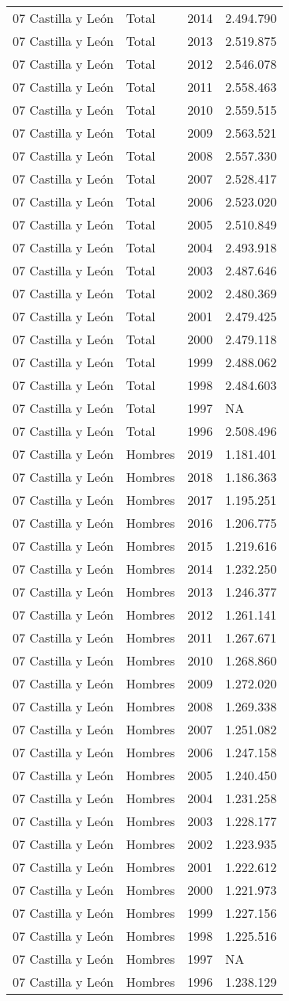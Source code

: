 \documentclass[
]{article}
\begin{document}
\begin{longtable}[]{@{}llrl@{}}
07 Castilla y León & Total & 2014 & 2.494.790\tabularnewline
07 Castilla y León & Total & 2013 & 2.519.875\tabularnewline
07 Castilla y León & Total & 2012 & 2.546.078\tabularnewline
07 Castilla y León & Total & 2011 & 2.558.463\tabularnewline
07 Castilla y León & Total & 2010 & 2.559.515\tabularnewline
07 Castilla y León & Total & 2009 & 2.563.521\tabularnewline
07 Castilla y León & Total & 2008 & 2.557.330\tabularnewline
07 Castilla y León & Total & 2007 & 2.528.417\tabularnewline
07 Castilla y León & Total & 2006 & 2.523.020\tabularnewline
07 Castilla y León & Total & 2005 & 2.510.849\tabularnewline
07 Castilla y León & Total & 2004 & 2.493.918\tabularnewline
07 Castilla y León & Total & 2003 & 2.487.646\tabularnewline
07 Castilla y León & Total & 2002 & 2.480.369\tabularnewline
07 Castilla y León & Total & 2001 & 2.479.425\tabularnewline
07 Castilla y León & Total & 2000 & 2.479.118\tabularnewline
07 Castilla y León & Total & 1999 & 2.488.062\tabularnewline
07 Castilla y León & Total & 1998 & 2.484.603\tabularnewline
07 Castilla y León & Total & 1997 & NA\tabularnewline
07 Castilla y León & Total & 1996 & 2.508.496\tabularnewline
07 Castilla y León & Hombres & 2019 & 1.181.401\tabularnewline
07 Castilla y León & Hombres & 2018 & 1.186.363\tabularnewline
07 Castilla y León & Hombres & 2017 & 1.195.251\tabularnewline
07 Castilla y León & Hombres & 2016 & 1.206.775\tabularnewline
07 Castilla y León & Hombres & 2015 & 1.219.616\tabularnewline
07 Castilla y León & Hombres & 2014 & 1.232.250\tabularnewline
07 Castilla y León & Hombres & 2013 & 1.246.377\tabularnewline
07 Castilla y León & Hombres & 2012 & 1.261.141\tabularnewline
07 Castilla y León & Hombres & 2011 & 1.267.671\tabularnewline
07 Castilla y León & Hombres & 2010 & 1.268.860\tabularnewline
07 Castilla y León & Hombres & 2009 & 1.272.020\tabularnewline
07 Castilla y León & Hombres & 2008 & 1.269.338\tabularnewline
07 Castilla y León & Hombres & 2007 & 1.251.082\tabularnewline
07 Castilla y León & Hombres & 2006 & 1.247.158\tabularnewline
07 Castilla y León & Hombres & 2005 & 1.240.450\tabularnewline
07 Castilla y León & Hombres & 2004 & 1.231.258\tabularnewline
07 Castilla y León & Hombres & 2003 & 1.228.177\tabularnewline
07 Castilla y León & Hombres & 2002 & 1.223.935\tabularnewline
07 Castilla y León & Hombres & 2001 & 1.222.612\tabularnewline
07 Castilla y León & Hombres & 2000 & 1.221.973\tabularnewline
07 Castilla y León & Hombres & 1999 & 1.227.156\tabularnewline
07 Castilla y León & Hombres & 1998 & 1.225.516\tabularnewline
07 Castilla y León & Hombres & 1997 & NA\tabularnewline
07 Castilla y León & Hombres & 1996 & 1.238.129\tabularnewline

\end{longtable}
\end{document}

